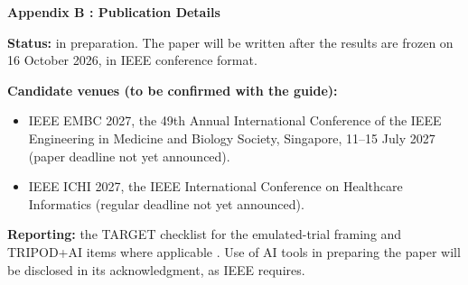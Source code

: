 \vspace*{5cm}
\begin{center}{\LARGE\bf Appendix B : Publication Details}\end{center}
\newpage
\noindent\textbf{Status:} in preparation. The paper will be written after the results are frozen on 16 October 2026, in IEEE conference format.

\noindent\textbf{Candidate venues (to be confirmed with the guide):}
\begin{itemize}
\item IEEE EMBC 2027, the 49th Annual International Conference of the IEEE Engineering in Medicine and Biology Society, Singapore, 11--15 July 2027 (paper deadline not yet announced).
\item IEEE ICHI 2027, the IEEE International Conference on Healthcare Informatics (regular deadline not yet announced).
\end{itemize}
\noindent\textbf{Reporting:} the TARGET checklist for the emulated-trial framing \cite{cashin2025} and TRIPOD+AI items where applicable \cite{collins2024}. Use of AI tools in preparing the paper will be disclosed in its acknowledgment, as IEEE requires.
